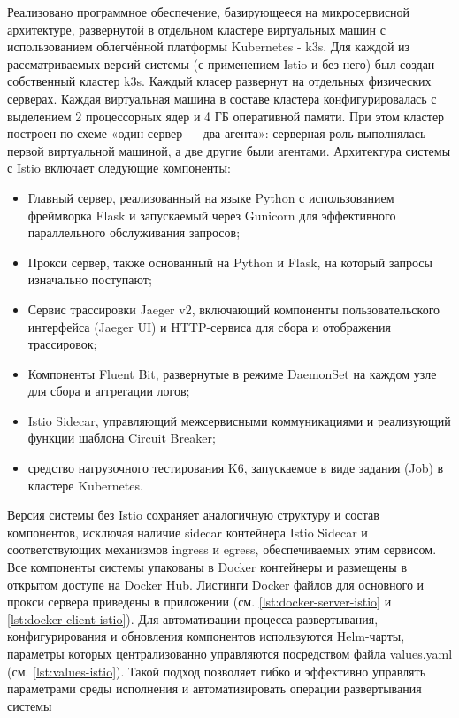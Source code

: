 Реализовано программное обеспечение, базирующееся на микросервисной архитектуре, развернутой в отдельном кластере виртуальных машин с использованием облегчённой платформы Kubernetes - k3s. Для каждой из рассматриваемых версий системы (с применением Istio и без него) был создан собственный кластер k3s. Каждый класер развернут на отдельных физических серверах.
Каждая виртуальная машина в составе кластера конфигурировалась с выделением 2 процессорных ядер и 4 ГБ оперативной памяти. При этом кластер построен по схеме «один сервер — два агента»: серверная роль выполнялась первой виртуальной машиной, а две другие были агентами.
Архитектура системы с Istio включает следующие компоненты:
\begin{itemize} 
  \item Главный сервер, реализованный на языке Python с использованием фреймворка Flask и запускаемый через Gunicorn для эффективного параллельного обслуживания запросов;
  \item Прокси сервер, также основанный на Python и Flask, на который запросы изначально поступают;
  \item Сервис трассировки Jaeger v2, включающий компоненты пользовательского интерфейса (Jaeger UI) и HTTP-сервиса для сбора и отображения трассировок;
  \item Компоненты Fluent Bit, развернутые в режиме DaemonSet на каждом узле для сбора и аггрегации логов;
  \item Istio Sidecar, управляющий межсервисными коммуникациями и реализующий функции шаблона Circuit Breaker;
  \item средство нагрузочного тестирования K6, запускаемое в виде задания (Job) в кластере Kubernetes.
\end{itemize}

Версия системы без Istio сохраняет аналогичную структуру и состав компонентов, исключая наличие sidecar контейнера Istio Sidecar и соответствующих механизмов ingress и egress, обеспечиваемых этим сервисом.
Все компоненты системы упакованы в Docker контейнеры и размещены в открытом доступе на \href{https://hub.docker.com/repositories/robocatt}{Docker Hub}. Листинги Docker файлов для основного и прокси сервера приведены в приложении (см. \ref{lst:docker-server-istio} и \ref{lst:docker-client-istio}).
Для автоматизации процесса развертывания, конфигурирования и обновления компонентов используются Helm-чарты, параметры которых централизованно управляются посредством файла values.yaml (см. \ref{lst:values-istio}). Такой подход позволяет гибко и эффективно управлять параметрами среды исполнения и автоматизировать операции развертывания системы


